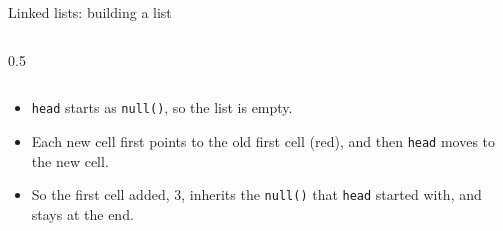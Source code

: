 \begin{frame}[fragile]{Linked lists: building a list}
\begin{columns}[T]
    \begin{column}{0.5\textwidth}
      
    \end{column}
  \end{columns}

  \vspace{0.8em}
  \begin{itemize}
    \item \texttt{head} starts as \texttt{null()}, so the list is empty.
    \item Each new cell first points to the old first cell (red), and then \texttt{head} moves to the new cell.
    \item So the first cell added, 3, inherits the \texttt{null()} that \texttt{head} started with, and stays at the end.
  \end{itemize}
\end{frame}


